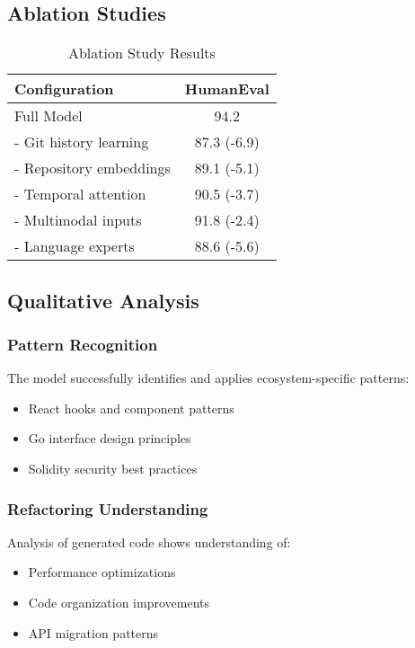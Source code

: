 \documentclass[11pt,a4paper]{article}
\begin{document}
\subsection{Ablation Studies}

\begin{table}[h]
\centering
\caption{Ablation Study Results}
\begin{tabular}{lc}
\toprule
Configuration & HumanEval \\
\midrule
Full Model & 94.2 \\
- Git history learning & 87.3 (-6.9) \\
- Repository embeddings & 89.1 (-5.1) \\
- Temporal attention & 90.5 (-3.7) \\
- Multimodal inputs & 91.8 (-2.4) \\
- Language experts & 88.6 (-5.6) \\
\bottomrule
\end{tabular}
\end{table}

\subsection{Qualitative Analysis}

\subsubsection{Pattern Recognition}
The model successfully identifies and applies ecosystem-specific patterns:
\begin{itemize}
    \item React hooks and component patterns
    \item Go interface design principles
    \item Solidity security best practices
\end{itemize}

\subsubsection{Refactoring Understanding}
Analysis of generated code shows understanding of:
\begin{itemize}
    \item Performance optimizations
    \item Code organization improvements
    \item API migration patterns
\end{itemize}
\end{document}
